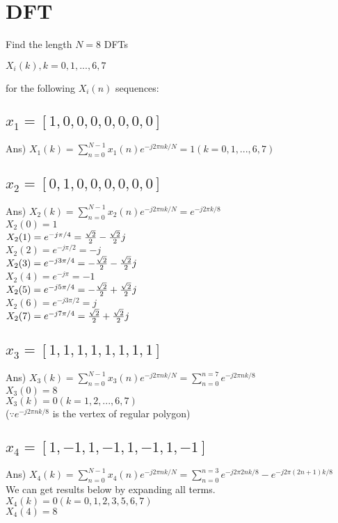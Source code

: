 \documentclass[12pt]{article}%
\begin{document}
\section{DFT}
Find the length $N=8$ DFTs \\ 
\begin{center}
    $X_i (k), k = 0, 1, ..., 6, 7$
\end{center}
for the following $X_i (n)$ sequences:
\subsection{$x_1 = [1,0,0,0,0,0,0,0]$}
Ans) $X_1 (k) = \sum_{n=0}^{N-1} x_1 (n) e^{- j 2 \pi n k / N} = 1 (k=0, 1, ..., 6, 7)$

\subsection{$x_2 = [0,1,0,0,0,0,0,0]$}
Ans) $X_2 (k) = \sum_{n=0}^{N-1} x_2 (n) e^{- j 2 \pi n k / N} = e^{-j 2 \pi k / 8}$\\
$X_2 (0) = 1$\\
$X_2 (1) = e^{- j \pi / 4} = {\sqrt{2} \over 2} - {\sqrt{2} \over 2}j$\\
$X_2 (2) = e^{- j \pi / 2} = -j$\\
$X_2 (3) = e^{- j 3 \pi / 4} = -{\sqrt{2} \over 2} - {\sqrt{2} \over 2}j$\\
$X_2 (4) = e^{- j \pi} = -1$\\
$X_2 (5) = e^{- j 5 \pi / 4} = -{\sqrt{2} \over 2} + {\sqrt{2} \over 2}j$\\
$X_2 (6) = e^{- j 3 \pi / 2} = j$\\
$X_2 (7) = e^{- j 7 \pi / 4} = {\sqrt{2} \over 2} + {\sqrt{2} \over 2}j$\\

\subsection{$x_3 = [1,1,1,1,1,1,1,1]$}
Ans) $X_3 (k) = \sum_{n=0}^{N-1} x_3 (n) e^{- j 2 \pi n k / N} = \sum_{n=0}^{n=7} e^{-j2\pi nk/8}$\\
$X_3 (0) = 8$\\
$X_3 (k) = 0 (k = 1, 2, ..., 6, 7)$ \\($\because e^{-j2\pi nk/8}$ is the vertex of regular polygon)
\subsection{$x_4 = [1,-1,1,-1,1,-1,1,-1]$}
Ans) $X_4 (k) = \sum_{n=0}^{N-1} x_4 (n) e^{- j 2 \pi n k / N} = \sum_{n=0}^{n=3} e^{- j 2 \pi 2n k / 8} - e^{- j 2 \pi (2n + 1) k / 8}$\\
We can get results below by expanding all terms.\\
$X_4 (k) = 0(k=0, 1, 2, 3, 5, 6, 7)$\\
$X_4 (4) = 8$
\bigskip
\bigskip
\bigskip
\bigskip
\bigskip
\bigskip
\bigskip
\bigskip
\bigskip
\end{document}
